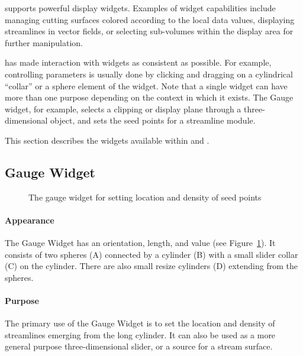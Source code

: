 \SR{} supports powerful display widgets.  Examples of widget
capabilities include managing cutting surfaces colored according to
the local data values, displaying streamlines in vector fields, or
selecting sub-volumes within the display area for further
manipulation.
 
\sci{} has made interaction with widgets as consistent as
possible. For example, controlling parameters is usually done by
clicking and dragging on a cylindrical ``collar'' or a sphere element
of the widget. Note that a single widget can have more than one
purpose depending on the context in which it exists. The Gauge widget,
for example, selects a clipping or display plane through a
three-dimensional object, and sets the seed points for a streamline
module.

This section describes the widgets available within \SR{} and \BIOPSE{}.
 
\subsection{Gauge Widget}
\label{sec:view-gaugewidget} 

\begin{figure}[htb]
  \begin{makeimage}
  \end{makeimage}
  \gaugewidget
  \caption{\label{fig:gaugewidget} The gauge widget for setting location and
    density of seed points}
\end{figure}

\paragraph{Appearance} The Gauge
Widget has an orientation, length, and value (see Figure~\ref{fig:gaugewidget}). It consists of two spheres (A) connected by a cylinder (B) with a
small slider collar (C) on the cylinder.  There are also small resize
cylinders (D) extending from the spheres.

\paragraph{Purpose} The primary use of the Gauge Widget is to set the
location and density of streamlines emerging from the long cylinder.  It
can also be used as a more general purpose three-dimensional slider, or a
source for a stream surface. 

